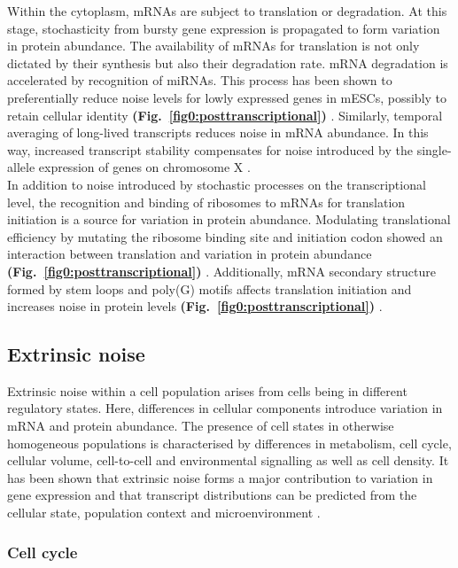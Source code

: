 \newpage

Within the cytoplasm, mRNAs are subject to translation or degradation. At this stage, stochasticity from bursty gene expression is propagated to form variation in protein abundance. 
The availability of mRNAs for translation is not only dictated by their synthesis but also their degradation rate. mRNA degradation is accelerated by recognition of \glspl{miRNA}. 
This process has been shown to preferentially reduce noise levels for lowly expressed genes in mESCs, possibly to retain cellular identity \textbf{(Fig.~\ref{fig0:posttranscriptional})} \citep{Schmiedel2015}. 
Similarly, temporal averaging of long-lived transcripts reduces noise in mRNA abundance. 
In this way, increased transcript stability compensates for noise introduced by the single-allele expression of genes on chromosome X \citep{Faure2017}.  \\

In addition to noise introduced by stochastic processes on the transcriptional level, the recognition and binding of ribosomes to mRNAs for translation initiation is a source for variation in protein abundance. 
Modulating translational efficiency by mutating the ribosome binding site and initiation codon showed an interaction between translation and variation in protein abundance \textbf{(Fig.~\ref{fig0:posttranscriptional})} \citep{Ozbudak2002}. 
Additionally, mRNA secondary structure formed by stem loops and poly(G) motifs affects translation initiation and increases noise in protein levels \textbf{(Fig.~\ref{fig0:posttranscriptional})} \citep{Dacheux2017a}.

\subsection{Extrinsic noise}

Extrinsic noise within a cell population arises from cells being in different regulatory states. 
Here, differences in cellular components introduce variation in mRNA and protein abundance. 
The presence of cell states in otherwise homogeneous populations is characterised by differences in metabolism, cell cycle, cellular volume, cell-to-cell and environmental signalling as well as cell density. 
It has been shown that extrinsic noise forms a major contribution to variation in gene expression and that transcript distributions can be predicted from the cellular state, population context and microenvironment \citep{Battich2015a}.

\subsubsection{Cell cycle}

